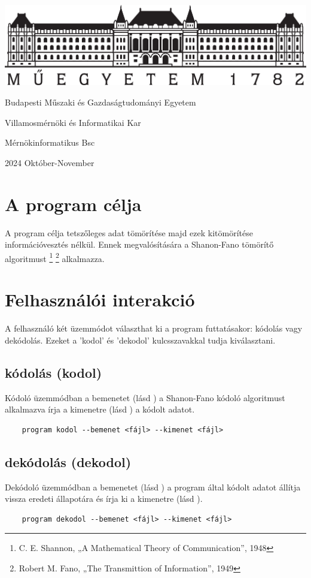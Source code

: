 \let\mypdfximage\pdfximage\def\pdfximage{\immediate\mypdfximage}\documentclass[twoside]{book}
\newcommand{\+}{\discretionary{\mbox{\scriptsize$\hookleftarrow$}}{}{}}
\begin{document}
\begin{titlepage}
    \includegraphics[totalheight=3cm]{BMEKicsi.png}\par
    Budapesti Műszaki és Gazdaságtudományi Egyetem\par
    Villamosmérnöki és Informatikai Kar\par
    Mérnökinformatikus Bsc\par
    {\large 2024 Október-November\par}
\end{titlepage}

\tableofcontents
\newpage
{}
\hypersetup{pageanchor=true}



\section{A program célja}
A program célja tetszőleges adat tömörítése majd ezek kitömörítése információvesztés nélkül.
Ennek megvalósítására a Shanon-Fano tömörítő algoritmust
\footnote{C. E. Shannon, „A Mathematical Theory of Communication”, 1948}
\footnote{Robert M. Fano, „The Transmittion of Information”, 1949}
alkalmazza.

\section{Felhasználói interakció}
A felhasználó két üzemmódot választhat ki a program futtatásakor: kódolás vagy dekódolás. Ezeket a 
'kodol' és 'dekodol' kulcsszavakkal tudja kiválasztani.
\subsection{kódolás (kodol)}
\label{sec:encode}
Kódoló üzemmódban a bemenetet (lásd ) a Shanon-Fano kódoló algoritmust alkalmazva írja a kimenetre (lásd ) a kódolt adatot.
\begin{verbatim}
    program kodol --bemenet <fájl> --kimenet <fájl>
\end{verbatim}
\subsection{dekódolás (dekodol)}
\label{sec:decode}
Dekódoló üzemmódban a bemenetet (lásd ) a program által kódolt adatot állítja vissza eredeti állapotára és írja ki a kimenetre (lásd ).
\begin{verbatim}
    program dekodol --bemenet <fájl> --kimenet <fájl>
\end{verbatim}
\end{document}
